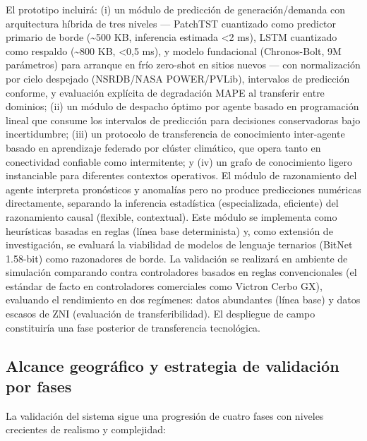 \documentclass[12pt,letterpaper]{article}
\begin{document}
El prototipo incluir\'a: (i) un m\'odulo de predicci\'on de generaci\'on/demanda con arquitectura h\'ibrida de tres niveles --- PatchTST cuantizado como predictor primario de borde (\textasciitilde500 KB, inferencia estimada <2 ms), LSTM cuantizado como respaldo (\textasciitilde800 KB, <0,5 ms), y modelo fundacional (Chronos-Bolt, 9M par\'ametros) para arranque en fr\'io zero-shot en sitios nuevos --- con normalizaci\'on por cielo despejado (NSRDB/NASA POWER/PVLib), intervalos de predicci\'on conforme, y evaluaci\'on expl\'icita de degradaci\'on MAPE al transferir entre dominios; (ii) un m\'odulo de despacho \'optimo por agente basado en programaci\'on lineal que consume los intervalos de predicci\'on para decisiones conservadoras bajo incertidumbre; (iii) un protocolo de transferencia de conocimiento inter-agente basado en aprendizaje federado por cl\'uster clim\'atico, que opera tanto en conectividad confiable como intermitente; y (iv) un grafo de conocimiento ligero instanciable para diferentes contextos operativos. El m\'odulo de razonamiento del agente interpreta pron\'osticos y anomal\'ias pero no produce predicciones num\'ericas directamente, separando la inferencia estad\'istica (especializada, eficiente) del razonamiento causal (flexible, contextual). Este m\'odulo se implementa como heur\'isticas basadas en reglas (l\'inea base determinista) y, como extensi\'on de investigaci\'on, se evaluar\'a la viabilidad de modelos de lenguaje ternarios (BitNet 1.58-bit) como razonadores de borde. La validaci\'on se realizar\'a en ambiente de simulaci\'on comparando contra controladores basados en reglas convencionales (el est\'andar de facto en controladores comerciales como Victron Cerbo GX), evaluando el rendimiento en dos reg\'imenes: datos abundantes (l\'inea base) y datos escasos de ZNI (evaluaci\'on de transferibilidad). El despliegue de campo constituir\'ia una fase posterior de transferencia tecnol\'ogica.

\subsection*{Alcance geogr\'afico y estrategia de validaci\'on por fases}

La validaci\'on del sistema sigue una progresi\'on de cuatro fases con niveles crecientes de realismo y complejidad:
\end{document}
